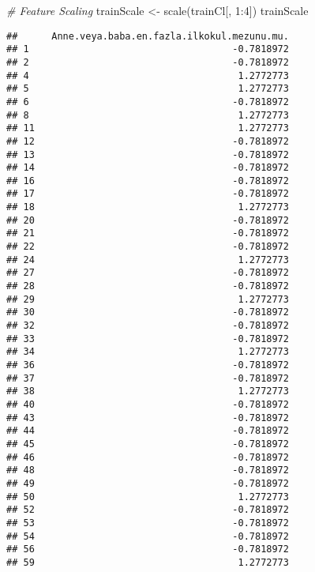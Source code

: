 \documentclass[
]{article}
\newenvironment{Shaded}{\begin{snugshade}}{\end{snugshade}}
\newcommand{\CommentTok}[1]{\textcolor[rgb]{0.56,0.35,0.01}{\textit{#1}}}
\newcommand{\DecValTok}[1]{\textcolor[rgb]{0.00,0.00,0.81}{#1}}
\newcommand{\FunctionTok}[1]{\textcolor[rgb]{0.00,0.00,0.00}{#1}}
\newcommand{\NormalTok}[1]{#1}
\newcommand{\OtherTok}[1]{\textcolor[rgb]{0.56,0.35,0.01}{#1}}
\newcommand{\SpecialCharTok}[1]{\textcolor[rgb]{0.00,0.00,0.00}{#1}}
\begin{document}
\begin{Shaded}
\begin{Highlighting}[]
\CommentTok{\# Feature Scaling}
\NormalTok{trainScale }\OtherTok{\textless{}{-}} \FunctionTok{scale}\NormalTok{(trainCl[, }\DecValTok{1}\SpecialCharTok{:}\DecValTok{4}\NormalTok{])}
\NormalTok{trainScale}
\end{Highlighting}
\end{Shaded}

\begin{verbatim}
##      Anne.veya.baba.en.fazla.ilkokul.mezunu.mu.
## 1                                    -0.7818972
## 2                                    -0.7818972
## 4                                     1.2772773
## 5                                     1.2772773
## 6                                    -0.7818972
## 8                                     1.2772773
## 11                                    1.2772773
## 12                                   -0.7818972
## 13                                   -0.7818972
## 14                                   -0.7818972
## 16                                   -0.7818972
## 17                                   -0.7818972
## 18                                    1.2772773
## 20                                   -0.7818972
## 21                                   -0.7818972
## 22                                   -0.7818972
## 24                                    1.2772773
## 27                                   -0.7818972
## 28                                   -0.7818972
## 29                                    1.2772773
## 30                                   -0.7818972
## 32                                   -0.7818972
## 33                                   -0.7818972
## 34                                    1.2772773
## 36                                   -0.7818972
## 37                                   -0.7818972
## 38                                    1.2772773
## 40                                   -0.7818972
## 43                                   -0.7818972
## 44                                   -0.7818972
## 45                                   -0.7818972
## 46                                   -0.7818972
## 48                                   -0.7818972
## 49                                   -0.7818972
## 50                                    1.2772773
## 52                                   -0.7818972
## 53                                   -0.7818972
## 54                                   -0.7818972
## 56                                   -0.7818972
## 59                                    1.2772773

\end{verbatim}
\end{document}
